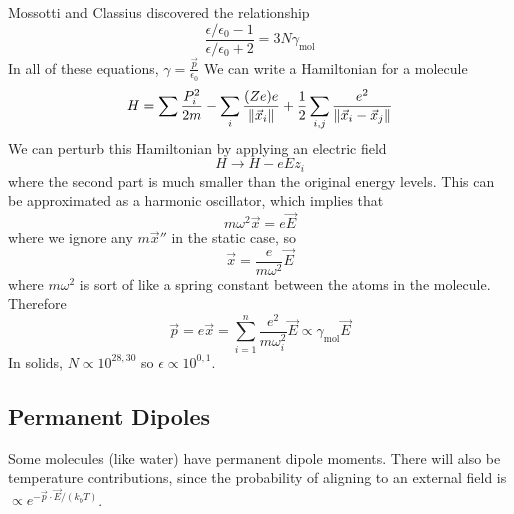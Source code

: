 \documentclass[a4paper,twoside,master.tex]{subfiles}
\begin{document}
Mossotti and Classius discovered the relationship
\begin{equation}
    \frac{\epsilon / \epsilon_0 - 1}{\epsilon / \epsilon_0 + 2} = 3 N \gamma_{\text{mol}}
\end{equation}
In all of these equations, $ \gamma = \frac{ \vec{p}}{\epsilon_0} $
We can write a Hamiltonian for a molecule
\begin{equation}
    H = \sum \frac{P_i^2}{2m} - \sum_i \frac{(Ze)e}{\norm{ \vec{x}_i}} + \frac{1}{2} \sum_{i,j} \frac{e^2}{\norm{ \vec{x}_i - \vec{x}_j}}
\end{equation}
We can perturb this Hamiltonian by applying an electric field
\begin{equation}
    H \to H - eEz_i
\end{equation}
where the second part is much smaller than the original energy levels. This can be approximated as a harmonic oscillator, which implies that
\begin{equation}
    m \omega^2 \vec{x} = e \vec{E}
\end{equation}
where we ignore any $ m \vec{x}'' $ in the static case, so
\begin{equation}
    \vec{x} = \frac{e}{m \omega^2} \vec{E}
\end{equation}
where $ m \omega^2 $ is sort of like a spring constant between the atoms in the molecule. Therefore
\begin{equation}
    \vec{p} = e \vec{x} = \sum_{i=1}^{n} \frac{e^2}{m \omega_i^2} \vec{E} \propto \gamma_{\text{mol}} \vec{E}
\end{equation}
In solids, $ N \propto 10^{28,30} $ so $ \epsilon \propto 10^{0,1} $.

\subsection{Permanent Dipoles}
\label{permanent_dipoles}

Some molecules (like water) have permanent dipole moments. There will also be temperature contributions, since the probability of aligning to an external field is $ \propto e^{- \vec{p} \cdot \vec{E}/(k_b T)} $.
\end{document}
